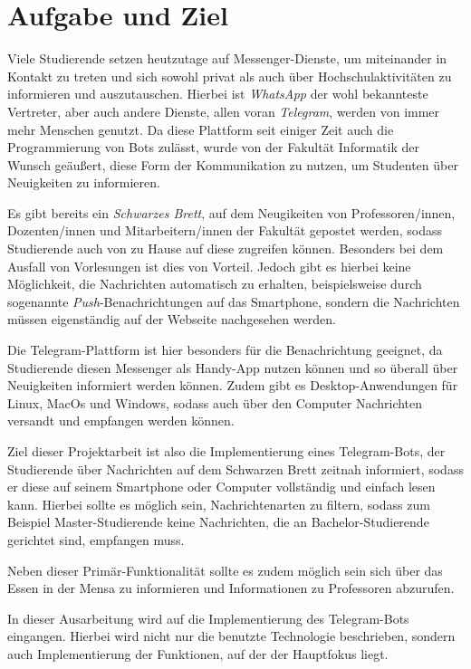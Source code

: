 \chapter{Aufgabe und Ziel}
Viele Studierende setzen heutzutage auf Messenger-Dienste, um miteinander in Kontakt zu treten und sich sowohl privat als auch über Hochschulaktivitäten zu informieren und auszutauschen. Hierbei ist \emph{WhatsApp} der wohl bekannteste Vertreter, aber auch andere Dienste, allen voran \emph{Telegram}, werden von immer mehr Menschen genutzt. Da diese Plattform seit einiger Zeit auch die Programmierung von Bots zulässt, wurde von der Fakultät Informatik der Wunsch geäußert, diese Form der Kommunikation zu nutzen, um Studenten über Neuigkeiten zu informieren.

Es gibt bereits ein \emph{Schwarzes Brett}, auf dem Neugikeiten von Professoren/innen, Dozenten/innen und Mitarbeitern/innen der Fakultät gepostet werden, sodass Studierende auch von zu Hause auf diese zugreifen können. Besonders bei dem Ausfall von Vorlesungen ist dies von Vorteil.
Jedoch gibt es hierbei keine Möglichkeit, die Nachrichten automatisch zu erhalten, beispielsweise durch sogenannte \textit{Push}-Benachrichtungen auf das Smartphone, sondern die Nachrichten müssen eigenständig auf der Webseite nachgesehen werden.

Die Telegram-Plattform ist hier besonders für die Benachrichtung geeignet, da Studierende diesen Messenger als Handy-App nutzen können und so überall über Neuigkeiten informiert werden können. Zudem gibt es Desktop-Anwendungen für Linux, MacOs und Windows, sodass auch über den Computer Nachrichten versandt und empfangen werden können.

Ziel dieser Projektarbeit ist also die Implementierung eines Telegram-Bots, der Studierende über Nachrichten auf dem Schwarzen Brett zeitnah informiert, sodass er diese auf seinem Smartphone oder Computer vollständig und einfach lesen kann. Hierbei sollte es möglich sein, Nachrichtenarten zu filtern, sodass zum Beispiel Master-Studierende keine Nachrichten, die an Bachelor-Studierende gerichtet sind, empfangen muss.

Neben dieser Primär-Funktionalität sollte es zudem möglich sein sich über das Essen in der Mensa zu informieren und Informationen zu Professoren abzurufen.

In dieser Ausarbeitung wird auf die Implementierung des Telegram-Bots eingangen. Hierbei wird nicht nur die benutzte Technologie beschrieben, sondern auch Implementierung der Funktionen, auf der der Hauptfokus liegt.
